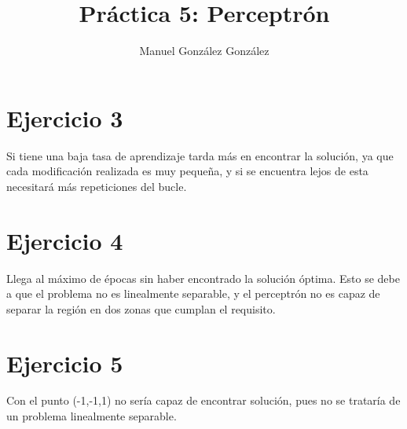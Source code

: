 \documentclass[12pt]{article}
\title{Práctica 5: Perceptrón}
\author{Manuel González González}
\begin{document}
\maketitle
\section*{Ejercicio 3}
Si tiene una baja tasa de aprendizaje tarda más en encontrar la solución, ya que cada modificación realizada es muy pequeña, y si se encuentra lejos de esta necesitará más repeticiones del bucle.
\section*{Ejercicio 4}
Llega al máximo de épocas sin haber encontrado la solución óptima. Esto se debe a que el problema no es linealmente separable, y el perceptrón no es capaz de separar la región en dos zonas que cumplan el requisito.
\section*{Ejercicio 5}
Con el punto (-1,-1,1) no sería capaz de encontrar solución, pues no se trataría de un problema linealmente separable.
\end{document}
